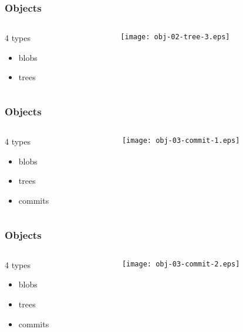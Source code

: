 \documentclass[english]{beamer}
\begin{document}
\begin{frame}
\frametitle{Objects}
\begin{columns}[t]
        \begin{column}[T]{.5\textwidth}
                4 types
                \begin{itemize}
                        \item blobs
                        \item trees
                \end{itemize}
        \end{column}
        \begin{column}[T]{.5\textwidth}
                \texttt{[image: obj-02-tree-3.eps]}
        \end{column}
\end{columns}
\end{frame}

\begin{frame}
\frametitle{Objects}
\begin{columns}[t]
        \begin{column}[T]{.5\textwidth}
                4 types
                \begin{itemize}
                        \item blobs
                        \item trees
                        \item commits
                \end{itemize}
        \end{column}
        \begin{column}[T]{.5\textwidth}
                \texttt{[image: obj-03-commit-1.eps]}
        \end{column}
\end{columns}
\end{frame}

\begin{frame}
\frametitle{Objects}
\begin{columns}[t]
        \begin{column}[T]{.5\textwidth}
                4 types
                \begin{itemize}
                        \item blobs
                        \item trees
                        \item commits
                \end{itemize}
        \end{column}
        \begin{column}[T]{.5\textwidth}
                \texttt{[image: obj-03-commit-2.eps]}
        \end{column}
\end{columns}
\end{frame}
\end{document}
